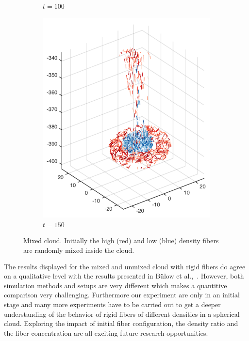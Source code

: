 \begin{figure}[htbp]
\begin{subfigure}[h]{0.24\textwidth}
    \caption{$t=100$}\label{fig:mixing_random_c}
  \end{subfigure}
  \begin{subfigure}[h]{0.24\textwidth}
    \centering
    \includegraphics[width=\textwidth]{img/mixing/random_00150.pdf}
    \caption{$t=150$}\label{fig:mixing_random_d}
  \end{subfigure}
  \caption[Mixed cloud.]{Mixed cloud. Initially the high (red) and low (blue) density fibers are randomly mixed inside the cloud.}
  \label{fig:mixed_sphere}
\end{figure}

The results displayed for the mixed and unmixed cloud with rigid fibers do agree on a qualitative level with the results presented in Bülow et al.,~\cite{Bulow2015}. However, both simulation methods and setups are very different which makes a quantitive comparison very challenging. Furthermore our experiment are only in an initial stage and many more experiments have to be carried out to get a deeper understanding of the behavior of rigid fibers of different densities in a spherical cloud. Exploring the impact of initial fiber configuration, the density ratio and the fiber concentration are all exciting future research opportunities.
